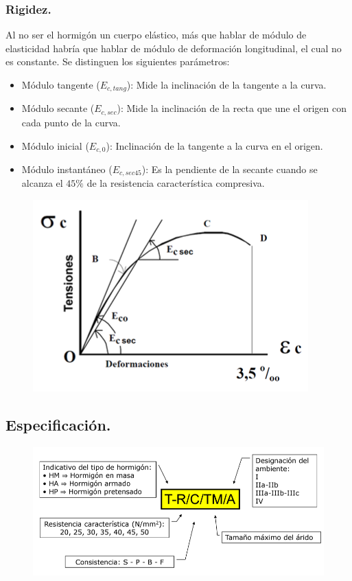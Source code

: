 \subsubsection{Rigidez.}
Al no ser el hormigón un cuerpo  elástico, más que hablar de módulo de elasticidad habría que hablar de módulo de deformación longitudinal, el cual no es constante. Se distinguen los siguientes parámetros:
\begin{itemize}
    \item Módulo tangente ($E_{c, tang}$): Mide la inclinación de la tangente a la curva.
    \item Módulo secante ($E_{c, sec}$): Mide la inclinación de la recta que une el origen con cada punto de la curva.
    \item Módulo inicial ($E_{c,0}$): Inclinación de la tangente a la curva en el origen.
    \item Módulo instantáneo ($E_{c, sec45}$): Es la pendiente de la secante cuando se alcanza el $45 \%$ de la resistencia característica compresiva.
\end{itemize}

\begin{figure}[H]
    \centering
    \includegraphics[width = 0.5 \textwidth]{Imagenes/Rigidez.png}
\end{figure}

\subsection{Especificación.}

\begin{figure}[H]
    \centering
    \includegraphics[width = 0.5 \textwidth]{Imagenes/Hormigon Especificacion.png}
\end{figure}

